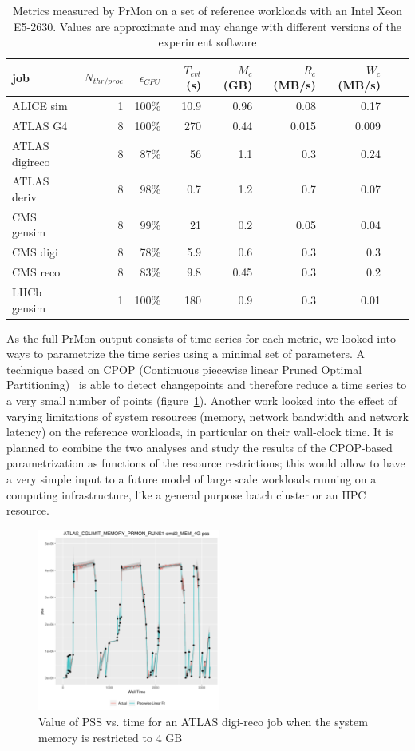 \begin{table}
\centering
\caption{Metrics measured by PrMon on a set of reference workloads with an Intel Xeon E5-2630. Values are approximate and may change with different versions of the experiment software}
\label{table:prmon}
\begin{tabular}{lrrrrrrrr}
\hline
job & $N_{thr/proc}$ & $\epsilon_{CPU}$ & $T_{evt}$ (s) & $M_{c}$ (GB) & $R_{c}$ (MB/s) & $W_{c}$ (MB/s) \\\hline
ALICE sim & 1 & 100\% & 10.9 & 0.96 & 0.08 & 0.17 \\
ATLAS G4 & 8 & 100\% & 270 & 0.44 & 0.015 & 0.009 \\
ATLAS digireco & 8 & 87\% & 56 & 1.1 & 0.3 & 0.24 \\
ATLAS deriv & 8 & 98\% & 0.7 & 1.2 & 0.7 & 0.07 \\
CMS gensim & 8 & 99\% & 21 & 0.2 & 0.05 & 0.04 \\
CMS digi & 8 & 78\% & 5.9 & 0.6 & 0.3 & 0.3 \\
CMS reco & 8 & 83\% & 9.8 & 0.45 & 0.3 & 0.2 \\
LHCb gensim & 1 & 100\% & 180 & 0.9 & 0.3 & 0.01 \\\hline
\end{tabular}
\end{table}
As the full PrMon output consists of time series for each metric, we
looked into ways to parametrize the time series using a minimal set of
parameters. A technique based on CPOP (Continuous piecewise linear
Pruned Optimal Partitioning)~\cite{cpop} is able to detect
changepoints and therefore reduce a time series to a very small number
of points (figure~\ref{fig:timeseries}). Another work looked into the
effect of varying limitations of system resources (memory, network
bandwidth and network latency) on the reference workloads, in
particular on their wall-clock time. It is planned to combine the two
analyses and study the results of the CPOP-based parametrization as
functions of the resource restrictions; this would allow to have a
very simple input to a future model of large scale workloads running
on a computing infrastructure, like a general purpose batch cluster or
an HPC resource.

\begin{figure}[t]
  \centering
  \includegraphics[height=6cm]{timeseries.png}
  \caption{Value of PSS vs. time for an ATLAS digi-reco job when the
    system memory is restricted to 4 GB}
  \label{fig:timeseries}
\end{figure}

